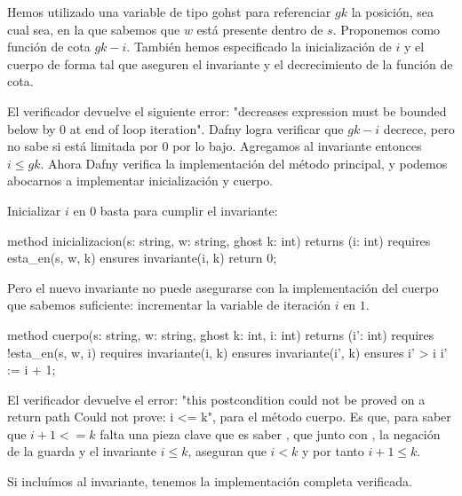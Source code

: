 \documentclass[12pt, a4paper, openany, fleqn]{book}
\begin{document}
    Hemos utilizado una variable de tipo gohst para referenciar $gk$ la posición, sea cual sea, en la que sabemos que $w$ está presente dentro de $s$. Proponemos como función de cota $gk - i$.
    También hemos especificado la inicialización de $i$ y el cuerpo de forma tal que aseguren el invariante y el decrecimiento de la función de cota.

    El verificador devuelve el siguiente error: "decreases expression must be bounded below by 0 at end of loop iteration". Dafny logra verificar que $gk -i$ decrece, pero no sabe si está limitada por 0 por lo bajo. Agregamos al invariante entonces $i \leq gk$. Ahora Dafny verifica la implementación del método principal, y podemos abocarnos a implementar inicialización y cuerpo.

    Inicializar $i$ en $0$ basta para cumplir el invariante:

    \begin{dafny}
method inicializacion(s: string, w: string, ghost k: int) returns (i: int)
  requires esta_en(s, w, k)
  ensures invariante(i, k)
{
  return 0;
}
    \end{dafny}

    Pero el nuevo invariante no puede asegurarse con la implementación del cuerpo que sabemos suficiente: incrementar la variable de iteración $i$ en $1$.

    \begin{dafny}
method cuerpo(s: string, w: string, ghost k: int, i: int) returns (i': int)
  requires !esta_en(s, w, i)
  requires invariante(i, k)
  ensures invariante(i', k)
  ensures i' > i
{
  i' := i + 1;
}
    \end{dafny}
    El verificador devuelve el error: "this postcondition could not be proved on a return path
    Could not prove: i <= k", para el método cuerpo.
    Es que, para saber que $i+1<=k$ falta una pieza clave que es saber , que junto con , la negación de la guarda y el invariante $i \leq k$, aseguran que $i < k$ y por tanto $i+1 \leq k$.

    Si incluímos  al invariante, tenemos la implementación completa verificada.

\end{document}
